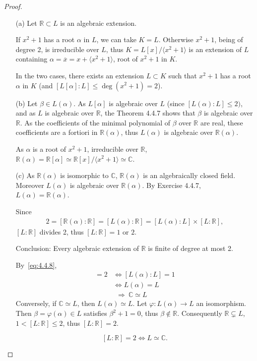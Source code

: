 \documentclass[11pt,a4paper]{article}
\newcommand{\R}{\mathbb{R}}
\newcommand{\C}{\mathbb{C}}
\begin{document}
\begin{proof}
\begin{enumerate}
\item[(a)]
Let $\R \subset L$ is an algebraic extension. 

If  $x^2+1$ has a root $\alpha$ in $L$, we can take  $K=L$. Otherwise $x^2+1$, being of degree 2, is irreducible over $L$, thus $K = L[x]/\langle x^2 +1\rangle$ is an extension of $L$ containing $\alpha = \overline{x} = x +\langle x^2 +1\rangle $, root of $x^2+1$ in $K$. 

In the two cases, there exists  an extension $L \subset K$ such that $x^2+1$ has a root $\alpha$ in $K$ (and $ [L[\alpha]:L] \leq \deg(x^2+1) = 2$).

\item[(b)] Let $\beta \in L(\alpha)$. As $L[\alpha]$ is algebraic over $L$ (since $[L(\alpha) : L] \leq 2)$, and as $L$ is algebraic over $\R$, the Theorem 4.4.7 shows that $\beta$ is algebraic over $\R$. As the coefficients of the minimal polynomial of $\beta$ over $\R$ are real, these coefficients are a fortiori in $\R(\alpha)$, thus $L(\alpha)$ is algebraic over $\R(\alpha)$.

As  $\alpha$ is a root of $x^2+1$, irreducible over $\R$, $\R(\alpha) = \R[\alpha] \simeq \R[x]/\langle x^2+1\rangle \simeq \C$.

\item[(c)] 
As $\R(\alpha)$ is isomorphic to $\C$, $\R(\alpha)$ is an algebraically closed field. Moreover $L(\alpha)$ is algebraic over $\R(\alpha)$. By Exercise 4.4.7, $L(\alpha)=\R(\alpha)$.

Since
\begin{align}
2={[ \R(\alpha):\R]} = [L(\alpha) : \R] =  [L(\alpha) : L] \times [L:\R], \label{eq:4.4.8}
\end{align}
$[L:\R]$ divides 2, thus  $[L:\R] =  1$ or $2$.

Conclusion: Every algebraic extension of $\R$ is finite of degree at most 2.

By~\eqref{eq:4.4.8}, 
\begin{align*}
[L:\R] = 2 &\iff [L(\alpha) : L] = 1\\
&\iff L(\alpha) = L\\
&\ \ \Rightarrow\  \C\simeq L
\end{align*}
Conversely, if $\C \simeq L$, then $L(\alpha) \simeq L$. Let $\varphi : L(\alpha) \to L$ an isomorphism. Then $\beta = \varphi(\alpha)\in L$ satisfies $\beta^2 +1 = 0$, thus $\beta \not \in \R$. Consequently $\R \subsetneq L$, $1<[L : \R]\leq 2$, thus $[L:\R]= 2$.

$$[L:\R] = 2 \iff L \simeq \C.$$
\end{enumerate}
\end{proof}
\end{document}
